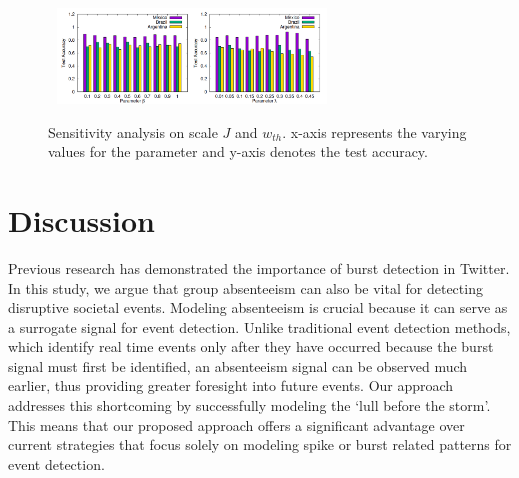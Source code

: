\documentclass[twoside,leqno,twocolumn]{article}
\begin{document}
\begin{figure}[h]
	\centering
    {
		\includegraphics[width= 3in,height=1in] {figures/scale-S.png}
		\label{fig:scale-S}
	}
    \vspace{-2mm}
	\caption{Sensitivity analysis on scale $J$ and $w_{th}$. x-axis represents the varying values for the parameter and y-axis denotes the test accuracy.}
	\label{fig:scale-S-wth}
\end{figure}



\section{Discussion} \label{sec:conclusion}
Previous research has demonstrated the importance of burst detection in Twitter. In this study, we argue that group absenteeism can also be vital for detecting disruptive societal events. Modeling absenteeism is crucial because it can serve as a surrogate signal for event detection. %
Unlike traditional event detection methods, which identify real time events only after they have occurred because the burst signal must first be identified, an absenteeism signal can be observed much earlier, thus providing greater foresight into future events.
Our approach addresses this shortcoming by successfully modeling the `lull before the storm'.
This means that our proposed approach offers a significant advantage over current strategies that focus solely on modeling spike or burst related patterns for event detection.

\end{document}
